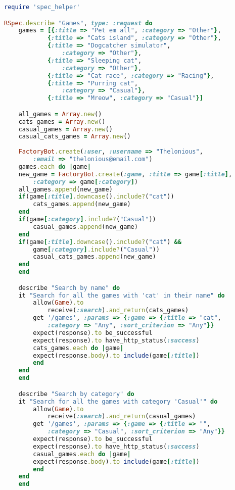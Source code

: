 \begin{lstlisting}[language=Ruby]
require 'spec_helper'

RSpec.describe "Games", type: :request do
    games = [{:title => "Pet em all", :category => "Other"},
            {:title => "Cats island", :category => "Other"},
            {:title => "Dogcatcher simulator", 
                :category => "Other"},
            {:title => "Sleeping cat", 
                :category => "Other"},
            {:title => "Cat race", :category => "Racing"},
            {:title => "Purring cat", 
                :category => "Casual"},
            {:title => "Mreow", :category => "Casual"}]

    all_games = Array.new()
    cats_games = Array.new()
    casual_games = Array.new()
    casual_cats_games = Array.new()
    
    FactoryBot.create(:user, :username => "Thelonious", 
        :email => "thelonious@email.com")
    games.each do |game|
    new_game = FactoryBot.create(:game, :title => game[:title], 
        :category => game[:category])
    all_games.append(new_game)
    if(game[:title].downcase().include?("cat"))
        cats_games.append(new_game)
    end
    if(game[:category].include?("Casual"))
        casual_games.append(new_game)
    end      
    if(game[:title].downcase().include?("cat") && 
        game[:category].include?("Casual"))
        casual_cats_games.append(new_game)
    end
    end

    describe "Search by name" do
    it "Search for all the games with 'cat' in their name" do
        allow(Game).to 
            receive(:search).and_return(cats_games)
        get '/games', :params => {:game => {:title => "cat", 
            :category => "Any", :sort_criterion => "Any"}}
        expect(response).to be_successful
        expect(response).to have_http_status(:success)
        cats_games.each do |game|
        expect(response.body).to include(game[:title])
        end
    end
    end

    describe "Search by category" do
    it "Search for all the games with category 'Casual'" do
        allow(Game).to 
            receive(:search).and_return(casual_games)
        get '/games', :params => {:game => {:title => "", 
            :category => "Casual", :sort_criterion => "Any"}}
        expect(response).to be_successful
        expect(response).to have_http_status(:success)
        casual_games.each do |game|
        expect(response.body).to include(game[:title])
        end
    end
    end


\end{lstlisting}
